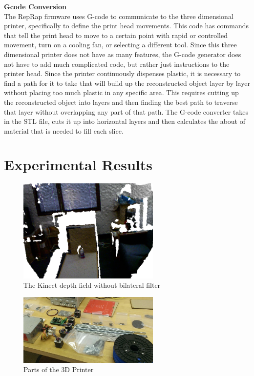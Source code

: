 \documentclass[12pt,twocolumn]{article}
\begin{document}
{ \bf Gcode Conversion}\\ 
The RepRap firmware uses G-code to communicate to the three dimensional printer, specifically to define the print head movements. This code has commands that tell the print head to move to a certain point with rapid or controlled movement, turn on a cooling fan, or selecting a different tool. Since this three dimensional printer does not have as many features, the G-code generator does not have to add much complicated code, but rather just instructions to the printer head. Since the printer continuously dispenses plastic, it is necessary to find a path for it to take that will build up the reconstructed object layer by layer without placing too much plastic in any specific area. This requires cutting up the reconstructed object into layers and then finding the best path to traverse that layer without overlapping any part of that path. The G-code converter takes in the STL file, cuts it up into horizontal layers and then calculates the about of material that is needed to fill each slice. 



\section{Experimental Results}

\begin{figure}[ht!]
\centering
\includegraphics[width=70mm]{kinectwaterbottle.png}
\caption{The Kinect depth field without bilateral filter}
\label{overflow}
\end{figure}

\begin{figure}[ht!]
\centering
\includegraphics[width=70mm]{WP_20130223_002.jpg}
\caption{Parts of the 3D Printer}
\label{overflow}
\end{figure}
\end{document}
